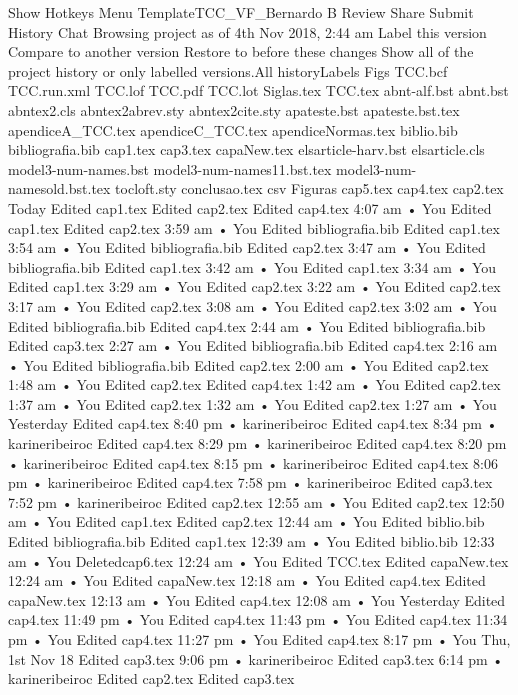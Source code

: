    Show Hotkeys
Menu
TemplateTCC_VF_Bernardo
B
Review
Share
Submit
History
Chat
Browsing project as of 4th Nov 2018, 2:44 am
 Label this version Compare to another version Restore to before these changes
Show all of the project history or only labelled versions.All historyLabels
Figs
TCC.bcf
TCC.run.xml
TCC.lof
TCC.pdf
TCC.lot
Siglas.tex
TCC.tex
abnt-alf.bst
abnt.bst
abntex2.cls
abntex2abrev.sty
abntex2cite.sty
apateste.bst
apateste.bst.tex
apendiceA_TCC.tex
apendiceC_TCC.tex
apendiceNormas.tex
biblio.bib
bibliografia.bib
cap1.tex
cap3.tex
capaNew.tex
elsarticle-harv.bst
elsarticle.cls
model3-num-names.bst
model3-num-names11.bst.tex
model3-num-namesold.bst.tex
tocloft.sty
conclusao.tex
csv
Figuras
cap5.tex
cap4.tex
cap2.tex
Today
Edited cap1.tex
Edited cap2.tex
Edited cap4.tex
4:07 am • You
Edited cap1.tex
Edited cap2.tex
3:59 am • You
Edited bibliografia.bib
Edited cap1.tex
3:54 am • You
Edited bibliografia.bib
Edited cap2.tex
3:47 am • You
Edited bibliografia.bib
Edited cap1.tex
3:42 am • You
Edited cap1.tex
3:34 am • You
Edited cap1.tex
3:29 am • You
Edited cap2.tex
3:22 am • You
Edited cap2.tex
3:17 am • You
Edited cap2.tex
3:08 am • You
Edited cap2.tex
3:02 am • You
Edited bibliografia.bib
Edited cap4.tex
2:44 am • You
Edited bibliografia.bib
Edited cap3.tex
2:27 am • You
Edited bibliografia.bib
Edited cap4.tex
2:16 am • You
Edited bibliografia.bib
Edited cap2.tex
2:00 am • You
Edited cap2.tex
1:48 am • You
Edited cap2.tex
Edited cap4.tex
1:42 am • You
Edited cap2.tex
1:37 am • You
Edited cap2.tex
1:32 am • You
Edited cap2.tex
1:27 am • You
Yesterday
Edited cap4.tex
8:40 pm • karineribeiroc
Edited cap4.tex
8:34 pm • karineribeiroc
Edited cap4.tex
8:29 pm • karineribeiroc
Edited cap4.tex
8:20 pm • karineribeiroc
Edited cap4.tex
8:15 pm • karineribeiroc
Edited cap4.tex
8:06 pm • karineribeiroc
Edited cap4.tex
7:58 pm • karineribeiroc
Edited cap3.tex
7:52 pm • karineribeiroc
Edited cap2.tex
12:55 am • You
Edited cap2.tex
12:50 am • You
Edited cap1.tex
Edited cap2.tex
12:44 am • You
Edited biblio.bib
Edited bibliografia.bib
Edited cap1.tex
12:39 am • You
Edited biblio.bib
12:33 am • You
Deletedcap6.tex
12:24 am • You
Edited TCC.tex
Edited capaNew.tex
12:24 am • You
Edited capaNew.tex
12:18 am • You
Edited cap4.tex
Edited capaNew.tex
12:13 am • You
Edited cap4.tex
12:08 am • You
Yesterday
Edited cap4.tex
11:49 pm • You
Edited cap4.tex
11:43 pm • You
Edited cap4.tex
11:34 pm • You
Edited cap4.tex
11:27 pm • You
Edited cap4.tex
8:17 pm • You
Thu, 1st Nov 18
Edited cap3.tex
9:06 pm • karineribeiroc
Edited cap3.tex
6:14 pm • karineribeiroc
Edited cap2.tex
Edited cap3.tex
